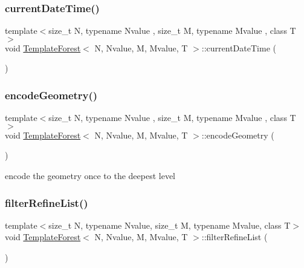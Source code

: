 \subsubsection{\texorpdfstring{current\+Date\+Time()}{currentDateTime()}}
{\footnotesize\ttfamily template$<$size\+\_\+t N, typename Nvalue , size\+\_\+t M, typename Mvalue , class T $>$ \\
void \mbox{\hyperlink{classTemplateForest}{Template\+Forest}}$<$ N, Nvalue, M, Mvalue, T $>$\+::current\+Date\+Time (\begin{DoxyParamCaption}{ }\end{DoxyParamCaption})}

\mbox{\label{classTemplateForest_a918118ff88c9f738de633c0e83a8b69b}} 
\subsubsection{\texorpdfstring{encode\+Geometry()}{encodeGeometry()}}
{\footnotesize\ttfamily template$<$size\+\_\+t N, typename Nvalue , size\+\_\+t M, typename Mvalue , class T $>$ \\
void \mbox{\hyperlink{classTemplateForest}{Template\+Forest}}$<$ N, Nvalue, M, Mvalue, T $>$\+::encode\+Geometry (\begin{DoxyParamCaption}{ }\end{DoxyParamCaption})}

encode the geometry once to the deepest level \mbox{\label{classTemplateForest_a76986ce40169fb0e9f517ebd538c98cf}} 
\subsubsection{\texorpdfstring{filter\+Refine\+List()}{filterRefineList()}}
{\footnotesize\ttfamily template$<$size\+\_\+t N, typename Nvalue, size\+\_\+t M, typename Mvalue, class T$>$ \\
void \mbox{\hyperlink{classTemplateForest}{Template\+Forest}}$<$ N, Nvalue, M, Mvalue, T $>$\+::filter\+Refine\+List (\begin{DoxyParamCaption}{ }\end{DoxyParamCaption})}

